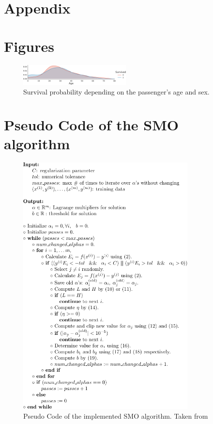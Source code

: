 \section*{Appendix}
\section{Figures}
 \begin{figure}[h]
 \centering
     \includegraphics[width=0.5\textwidth]{media_saved/age_all}
     \caption{Survival probability depending on the passenger's age and sex.}
     \label{fig:agesexfeat}
\end{figure}
\section{Pseudo Code of the SMO algorithm}
\begin{figure}[!h]
  \centering
    \includegraphics[width=0.8\textwidth]{media_saved/pseudo_code}
  \caption{Pseudo Code of the implemented SMO algorithm. Taken from\cite{smo}}  
  \label{fig:pseudo}  
\end{figure}

